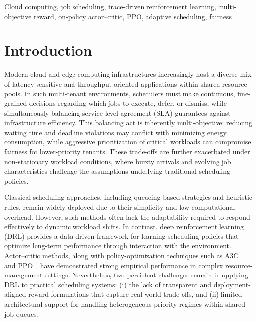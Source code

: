\documentclass[journal]{IEEEtran}
\begin{document}
\begin{IEEEkeywords}
Cloud computing, job scheduling, trace-driven reinforcement learning, multi-objective reward, on-policy actor--critic, PPO, adaptive scheduling, fairness
\end{IEEEkeywords}

\section{\textbf{Introduction}}
Modern cloud and edge computing infrastructures increasingly host a diverse mix of latency-sensitive and throughput-oriented applications within shared resource pools. In such multi-tenant environments, schedulers must make continuous, fine-grained decisions regarding which jobs to execute, defer, or dismiss, while simultaneously balancing service-level agreement (SLA) guarantees against infrastructure efficiency. This balancing act is inherently multi-objective: reducing waiting time and deadline violations may conflict with minimizing energy consumption, while aggressive prioritization of critical workloads can compromise fairness for lower-priority tenants. These trade-offs are further exacerbated under non-stationary workload conditions, where bursty arrivals and evolving job characteristics challenge the assumptions underlying traditional scheduling policies.

Classical scheduling approaches, including queueing-based strategies and heuristic rules, remain widely deployed due to their simplicity and low computational overhead. However, such methods often lack the adaptability required to respond effectively to dynamic workload shifts. In contrast, deep reinforcement learning (DRL) provides a data-driven framework for learning scheduling policies that optimize long-term performance through interaction with the environment. Actor--critic methods, along with policy-optimization techniques such as A3C~\cite{mnih2016asynchronous} and PPO~\cite{schulman2017proximal}, have demonstrated strong empirical performance in complex resource-management settings. Nevertheless, two persistent challenges remain in applying DRL to practical scheduling systems: (i) the lack of transparent and deployment-aligned reward formulations that capture real-world trade-offs, and (ii) limited architectural support for handling heterogeneous priority regimes within shared job queues.
\end{document}
